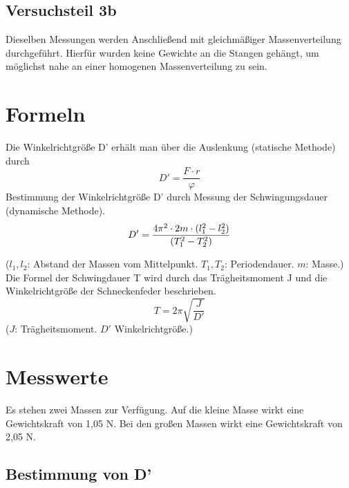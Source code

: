 \documentclass[12pt,a4paper,]{scrreprt}
\let\phi\varphi
\begin{document}
		\section{Versuchsteil 3b}
			Dieselben Messungen werden Anschließend mit gleichmäßiger Massenverteilung durchgeführt. Hierfür wurden keine Gewichte an die Stangen gehängt, um möglichst nahe an einer homogenen Massenverteilung zu sein.
	\chapter{Formeln}
    	Die Winkelrichtgröße D' erhält man über die Auslenkung (statische Methode) durch
        \begin{equation}
        	D' = \frac{F \cdot r}{\phi}
        \end{equation}
		Bestimmung der Winkelrichtgröße D' durch Messung der Schwingungsdauer (dynamische Methode).\\
        \begin{equation}
			D'=\frac{4\pi^2 \cdot 2m\cdot (l_1^2-l_2^2)}{(T_1^2-T_2^2)}\\
            \label{winkelrichtgroesse}
		\end{equation}
        
        ($l_1, l_2$: Abstand der Massen vom Mittelpunkt. $T_1, T_2$: Periodendauer. $m$: Masse.)
        \\
       
             Die Formel der Schwingdauer T wird durch das Trägheitsmoment J und die Winkelrichtgröße der Schneckenfeder beschrieben.
	\begin{equation}
		T = 2 \pi \sqrt{\frac{J}{D'}}
        \label{traegheitsmoment}
	\end{equation}
    ($J$: Trägheitsmoment. $D'$ Winkelrichtgröße.)\\
	\pagebreak
		
		
    \chapter{Messwerte}
 Es stehen zwei Massen zur Verfügung. Auf die kleine Masse wirkt eine Gewichtskraft von 1,05 N. Bei den großen Massen wirkt eine Gewichtskraft von 2,05 N.
 \section{Bestimmung von D'}
\end{document}
